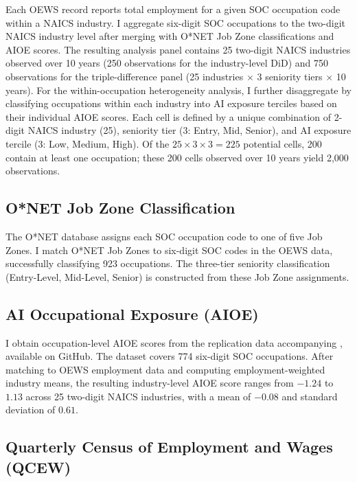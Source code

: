 \documentclass[12pt]{article}
\begin{document}
Each OEWS record reports total employment for a given SOC occupation code within a NAICS industry. I aggregate six-digit SOC occupations to the two-digit NAICS industry level after merging with O*NET Job Zone classifications and AIOE scores. The resulting analysis panel contains 25 two-digit NAICS industries observed over 10 years (250 observations for the industry-level DiD) and 750 observations for the triple-difference panel (25 industries $\times$ 3 seniority tiers $\times$ 10 years). For the within-occupation heterogeneity analysis, I further disaggregate by classifying occupations within each industry into AI exposure terciles based on their individual AIOE scores. Each cell is defined by a unique combination of 2-digit NAICS industry (25), seniority tier (3: Entry, Mid, Senior), and AI exposure tercile (3: Low, Medium, High). Of the $25 \times 3 \times 3 = 225$ potential cells, 200 contain at least one occupation; these 200 cells observed over 10 years yield 2,000 observations.

\subsection{O*NET Job Zone Classification}

The O*NET database assigns each SOC occupation code to one of five Job Zones. I match O*NET Job Zones to six-digit SOC codes in the OEWS data, successfully classifying 923 occupations. The three-tier seniority classification (Entry-Level, Mid-Level, Senior) is constructed from these Job Zone assignments.

\subsection{AI Occupational Exposure (AIOE)}

I obtain occupation-level AIOE scores from the replication data accompanying \citet{felten2021}, available on GitHub. The dataset covers 774 six-digit SOC occupations. After matching to OEWS employment data and computing employment-weighted industry means, the resulting industry-level AIOE score ranges from $-1.24$ to $1.13$ across 25 two-digit NAICS industries, with a mean of $-0.08$ and standard deviation of $0.61$.

\subsection{Quarterly Census of Employment and Wages (QCEW)}
\end{document}
